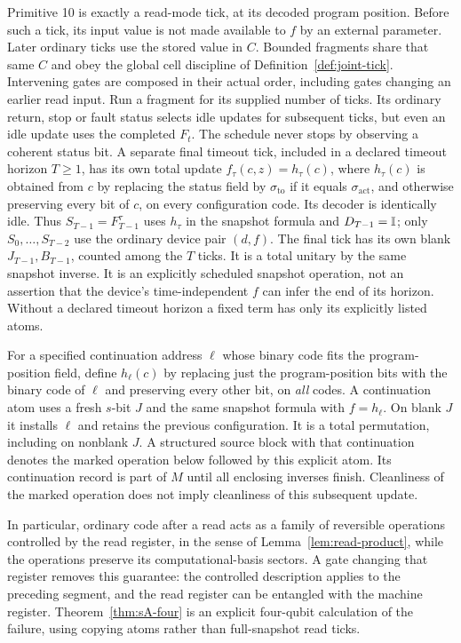 \begin{definition}\label{def:read}
Primitive 10 is exactly a read-mode tick, at its decoded program position.
Before such a tick, its input value is not made available to $f$ by an
external parameter. Later ordinary ticks use the stored value in $C$.
Bounded fragments share that same $C$ and obey the global cell discipline
of Definition~\ref{def:joint-tick}. Intervening gates are composed in their
actual order, including gates changing an earlier read input.
Run a fragment for its supplied number of ticks. Its ordinary return,
stop or fault status selects idle updates for subsequent ticks, but even
an idle update uses the completed $F_t$. The schedule never stops by
observing a coherent status bit. A separate final timeout tick, included
in a declared timeout horizon $T\geq1$, has its own total update
$f_\tau(c,z)=h_\tau(c)$, where $h_\tau(c)$ is obtained from $c$ by
replacing the status field by $\sigma_{\mathrm{to}}$ if it equals
$\sigma_{\mathrm{act}}$, and otherwise preserving every bit of $c$,
on every configuration code. Its decoder
is identically idle. Thus $S_{T-1}=F_{T-1}^{\tau}$ uses $h_\tau$ in
the snapshot formula and $D_{T-1}=\mathbb{I}$; only $S_0,\ldots,S_{T-2}$
use the ordinary device pair $(d,f)$. The final tick has its own blank
$J_{T-1},B_{T-1}$, counted among the $T$ ticks. It is a total unitary
by the same snapshot inverse. It is an explicitly scheduled snapshot
operation, not an assertion that the device's time-independent $f$
can infer the end of its horizon. Without a declared timeout horizon a
fixed term has only its explicitly listed atoms.

For a specified continuation address $\ell$ whose binary code fits
the program-position field, define $h_\ell(c)$ by
replacing just the program-position bits with the binary code of $\ell$
and preserving every other bit, on \emph{all} codes. A continuation atom
uses a fresh $s$-bit $J$ and the same snapshot formula with $f=h_\ell$.
On blank $J$ it installs $\ell$ and retains the previous configuration.
It is a total permutation, including on nonblank $J$.
A structured source block with that continuation denotes the marked
operation below followed by this explicit atom. Its continuation record
is part of $M$ until all enclosing inverses finish. Cleanliness of the
marked operation does not imply cleanliness of this subsequent update.
\end{definition}

In particular, ordinary code after a read acts as a family of reversible
operations controlled by the read register, in the sense of
Lemma~\ref{lem:read-product}, while the operations preserve its
computational-basis sectors. A gate changing that register removes this
guarantee: the controlled description applies to the preceding segment,
and the read register can be entangled with the machine register.
Theorem~\ref{thm:sA-four} is an explicit four-qubit calculation of the
failure, using copying atoms rather than full-snapshot read ticks.

